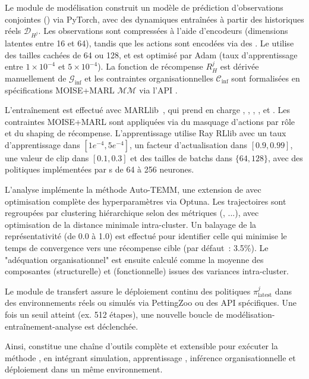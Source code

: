 
Le module de modélisation construit un modèle de prédiction d'observations conjointes () via PyTorch, avec des dynamiques  entraînées à partir des historiques réels $\mathcal{D}_{H^j}$. Les observations sont compressées à l'aide d'encodeurs  (dimensions latentes entre 16 et 64), tandis que les actions sont encodées via des . Le  utilise des tailles cachées de 64 ou 128, et est optimisé par Adam (taux d'apprentissage entre $1 \times 10^{-4}$ et $5 \times 10^{-4}$). La fonction de récompense $R^j_H$ est dérivée manuellement de $\mathcal{G}_{\text{inf}}$ et les contraintes organisationnelles $\mathcal{C}_{\text{inf}}$ sont formalisées en spécifications MOISE+MARL $\mathcal{MM}$ via l'API .

L'entraînement est effectué avec MARLlib~\cite{hu2022marllib}, qui prend en charge , , , ,  et . Les contraintes MOISE+MARL sont appliquées via du masquage d'actions par rôle et du shaping de récompense. L'apprentissage utilise Ray RLlib avec un taux d'apprentissage dans $[1e^{-4}, 5e^{-4}]$, un facteur d'actualisation dans $[0.9, 0.99]$, une valeur de clip  dans $[0.1, 0.3]$ et des tailles de batchs dans $\{64, 128\}$, avec des politiques implémentées par s de 64 à 256 neurones.

L'analyse implémente la méthode Auto-TEMM, une extension de  avec optimisation complète des hyperparamètres via Optuna. Les trajectoires sont regroupées par clustering hiérarchique selon des métriques (, ...), avec optimisation de la distance minimale intra-cluster. Un balayage de la représentativité (de 0.0 à 1.0) est effectué pour identifier celle qui minimise le temps de convergence vers une récompense cible (par défaut~: 3.5\%). Le "adéquation  organisationnel" est ensuite calculé comme la moyenne des composantes  (structurelle) et  (fonctionnelle) issues des variances intra-cluster.

Le module de transfert assure le déploiement continu des politiques $\pi^j_{\text{latest}}$ dans des environnements réels ou simulés via PettingZoo ou des API spécifiques. Une fois un seuil atteint (ex. 512 étapes), une nouvelle boucle de modélisation-entraînement-analyse est déclenchée.

Ainsi,  constitue une chaîne d'outils complète et extensible pour exécuter la méthode , en intégrant simulation, apprentissage , inférence organisationnelle et déploiement dans un même environnement.

